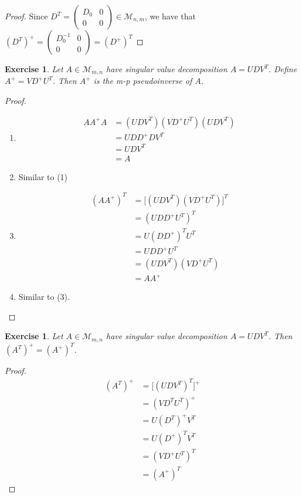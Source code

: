 \documentclass[12pt]{amsart}
\newtheorem{ex}[thm]{Exercise}
\newcommand{\MM}{\mathcal{M}}
\begin{document}
\begin{proof}
Since $D^T = \begin{pmatrix}
D_0 & 0 \\
0 & 0
\end{pmatrix} \in \MM_{n,m}$, we have that $(D^T)^+ = 
\begin{pmatrix}
D_0^{-1} & 0 \\
0 & 0
\end{pmatrix}
= (D^+)^T$
\end{proof}

\begin{ex}
Let $A \in \MM_{m, n}$ have singular value decomposition $A = UDV^T$. Define $A^+ = VD^+U^T$. Then $A^+$ is the m-p pseudoinverse of $A$.
\end{ex}

\begin{proof}
\begin{enumerate}
\item 
\begin{align*}
AA^+A 
&= (UDV^T)(VD^+U^T)(UDV^T) \\
&= UDD^+DV^T \\
&= UDV^T \\
&= A
\end{align*}
\item Similar to (1)
\item 
\begin{align*}
(AA^+)^T
&= \big[(UDV^T)(VD^+U^T)\big]^T\\
&= (UDD^+U^T)^T \\
&= U(DD^+)^TU^T \\
&= U DD^+ U^T \\
&= (UDV^T)(VD^+U^T) \\
&= AA^+
\end{align*}
\item Similar to (3).
\end{enumerate}
\end{proof}

\begin{ex}
Let $A \in \MM_{m,n}$ have singular value decomposition $A = UDV^T$. Then $(A^T)^+ = (A^+)^T$.
\end{ex}

\begin{proof} \
\begin{align*}
(A^T)^+ 
&= \big[(UDV^T)^T\big]^+ \\
&= (VD^TU^T)^+ \\
&= U(D^T)^+V^T \\
&= U(D^+)^TV^T \\
&= (VD^+U^T)^T \\
&= (A^+)^T
\end{align*}
\end{proof}
\vspace{3mm}
\end{document}
